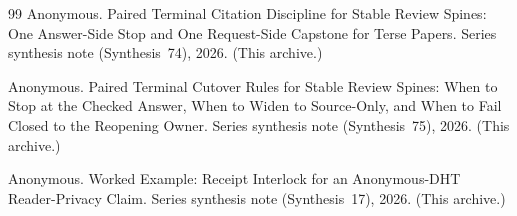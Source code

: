\documentclass[11pt]{article}
\begin{document}
\begin{thebibliography}{99}
Anonymous.
\newblock Paired Terminal Citation Discipline for Stable Review Spines: One Answer-Side Stop and One Request-Side Capstone for Terse Papers.
\newblock Series synthesis note (Synthesis~74), 2026. (This archive.)

Anonymous.
\newblock Paired Terminal Cutover Rules for Stable Review Spines: When to Stop at the Checked Answer, When to Widen to Source-Only, and When to Fail Closed to the Reopening Owner.
\newblock Series synthesis note (Synthesis~75), 2026. (This archive.)

Anonymous.
\newblock Worked Example: Receipt Interlock for an Anonymous-DHT Reader-Privacy Claim.
\newblock Series synthesis note (Synthesis~17), 2026. (This archive.)

\end{thebibliography}
\end{document}

